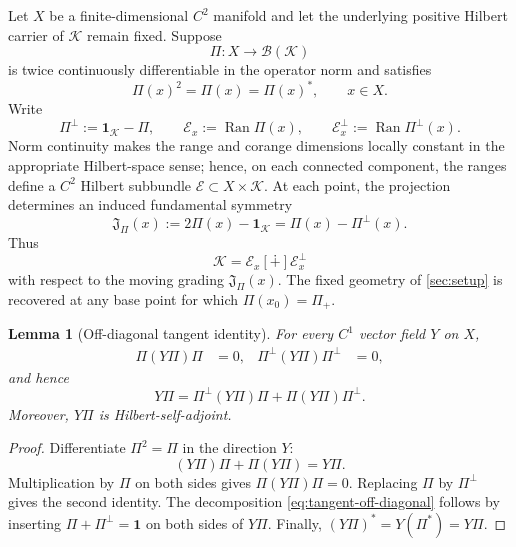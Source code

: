 \documentclass[11pt,reqno]{scrartcl}
\newcommand{\scrK}{\mathscr K}
\newcommand{\fundJ}{\mathfrak J}
\newcommand{\Pp}{\Pi_{+}}
\newcommand{\idop}{\mathbf 1}
\DeclareMathOperator{\Ran}{Ran}
\newcommand{\dsum}{\mathbin{[\dotplus]}}
\theoremstyle{plain}
\newtheorem{lemma}[lemma]{Lemma}
\theoremstyle{definition}
\theoremstyle{remark}
\begin{document}
Let \(X\) be a finite-dimensional \(C^2\) manifold and let the underlying
positive Hilbert carrier of \(\scrK\) remain fixed.  Suppose
\begin{equation}
  \Pi:X\longrightarrow\mathcal B(\scrK)
  \label{eq:projection-field}
\end{equation}
is twice continuously differentiable in the operator norm and satisfies
\begin{equation}
  \Pi(x)^2=\Pi(x)=\Pi(x)^*,
  \qquad x\in X.
  \label{eq:orthogonal-projection-field}
\end{equation}
Write
\begin{equation}
  \Pi^\perp:=\idop_{\scrK}-\Pi,
  \qquad
  \mathscr E_x:=\Ran\Pi(x),
  \qquad
  \mathscr E_x^\perp:=\Ran\Pi^\perp(x).
  \label{eq:moving-splitting}
\end{equation}
Norm continuity makes the range and corange dimensions locally constant in
the appropriate Hilbert-space sense; hence, on each connected component, the
ranges define a \(C^2\) Hilbert subbundle
\(\mathscr E\subset X\times\scrK\).  At each point, the projection determines
an induced fundamental symmetry
\begin{equation}
  \fundJ_{\Pi}(x):=2\Pi(x)-\idop_{\scrK}
  =\Pi(x)-\Pi^\perp(x).
  \label{eq:moving-J}
\end{equation}
Thus
\begin{equation}
  \scrK=\mathscr E_x\dsum\mathscr E_x^\perp
\end{equation}
with respect to the moving grading \(\fundJ_\Pi(x)\).  The fixed geometry of
\cref{sec:setup} is recovered at any base point for which
\(\Pi(x_0)=\Pp\).

\begin{lemma}[Off-diagonal tangent identity]
\label{lem:projection-tangent}
For every \(C^1\) vector field \(Y\) on \(X\),
\begin{align}
  \Pi(Y\Pi)\Pi&=0,
  &
  \Pi^\perp(Y\Pi)\Pi^\perp&=0,
  \label{eq:tangent-diagonal-zero}
\end{align}
and hence
\begin{equation}
  Y\Pi
  =\Pi^\perp(Y\Pi)\Pi+\Pi(Y\Pi)\Pi^\perp.
  \label{eq:tangent-off-diagonal}
\end{equation}
Moreover, \(Y\Pi\) is Hilbert-self-adjoint.
\end{lemma}

\begin{proof}
Differentiate \(\Pi^2=\Pi\) in the direction \(Y\):
\begin{equation}
  (Y\Pi)\Pi+\Pi(Y\Pi)=Y\Pi.
  \label{eq:differentiate-projection}
\end{equation}
Multiplication by \(\Pi\) on both sides gives
\(\Pi(Y\Pi)\Pi=0\).  Replacing \(\Pi\) by \(\Pi^\perp\) gives the second
identity.  The decomposition \eqref{eq:tangent-off-diagonal} follows by
inserting \(\Pi+\Pi^\perp=\idop\) on both sides of \(Y\Pi\).  Finally,
\((Y\Pi)^*=Y(\Pi^*)=Y\Pi\).
\end{proof}
\end{document}
